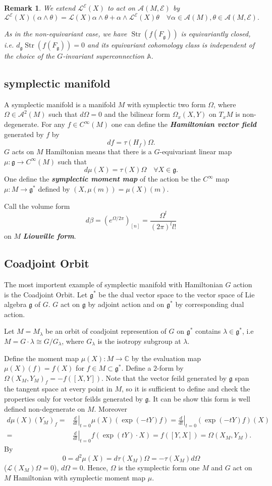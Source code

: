 \documentclass[11pt]{amsart}
\newtheorem{Rmk}[Thm]{Remark}
\def\cA{{\mathcal{A}}}
\def\cL{{\mathcal{L}}}
\def\cLE{\cL^\cE}
\def\cE{{\mathcal{E}}}
\def\bC{{\mathbb{C}}}
\def\bA{{\mathbb{A}}}
\def\Fg{{F_{\fgg}}}
\def\fgg{{\mathfrak{g}}}
\def\dg{{d_{\fgg}}}
\def\Str{\mathop{\mathrm{Str}}}
\def\kw#1{{\bf \em #1}}
\def\ddt{\left.\frac{d}{dt}\right|_{t=0}}
\begin{document}
\begin{Rmk}
We extend $\cL^\cE(X)$ to act on $\cA(M,\cE)$ by 
\[
\cLE(X)(\alpha\wedge \theta) =\cL(X) \alpha \wedge \theta +\alpha
\wedge \cLE(X)\theta \quad \forall \alpha\in \cA(M), \theta\in \cA(M,\cE).
\]

As in the non-equivariant case, we have $\Str(f(\Fg))$ is
equivariantly closed, i.e. $\dg \Str(f(\Fg)) = 0$ and its equivariant
cohomology class is independent of the choice of the $G$-invariant
superconnection $\bA$.
\end{Rmk}


\subsection{symplectic manifold}
A symplectic manifold is a manifold $M$ with symplectic two form
$\Omega$, where $\Omega\in \cA^2(M)$ such that $d\Omega=0$ and
the bilinear form $\Omega_x(X,Y)$ on $T_xM$ is non-degenerate.
For any $f\in C^\infty(M)$ one can define the \kw{Hamiltonian vector
  field} generated by $f$ by 
\[
df = \tau(H_f)\Omega.
\] 
$G$ acts on $M$ Hamiltonian means that there is a $G$-equivariant linear
map $\mu:\fgg\to C^\infty(M)$ such that 
\[
d\mu(X) = \tau(X) \Omega \quad \forall X\in \fgg.
\]
One define the \kw{symplectic moment map} of the action be the
$C^\infty$ map $\mu\colon M\to \fgg^*$ defined by $(X,\mu(m)) =
\mu(X)(m)$.

Call the volume form 
\[
d\beta=(e^{\Omega/2\pi})_[n] = \frac{\Omega^l}{(2\pi)^ll!}
\] 
on $M$ \kw{Liouville form}.

\subsection{Coadjoint Orbit}\label{Sec:co1}
The most importent example of symplectic manifold with Hamiltonian $G$
action is the Coadjoint Orbit. 
Let $\fgg^*$ be the dual vector space to the vector space of Lie
algebra $\fgg$ of $G$. $G$ act on $\fgg$ by adjoint action and on
$\fgg^*$ by corresponding dual action.

Let $M=M_\lambda$ be an orbit of coadjoint represention of $G$ on
$\fgg^*$ contains $\lambda \in \fgg^*$, i.e $M = G\cdot \lambda\cong
G/G_\lambda$, where $G_\lambda$ is the isotropy subgroup at $\lambda$.

Define the moment map $\mu(X)\colon M \to \bC$ by the evaluation map
$\mu(X)(f) = f(X)$ for $f\in M \subset \fgg^*$.
Define a $2$-form by $\Omega(X_M,Y_M)_f =-
f([X,Y])$. Note that the vector feild generated by $\fgg$ span the
tangent space at every point in $M$, so it is sufficient to define and
check the properties only for vector feilds generated by $\fgg$. It can be show this form is well defined non-degenerate on
$M$.
Moreover 
\[
\begin{split}
d\mu(X)(Y_M)_f  =& \ddt \mu(X)(\exp(-tY)f) =  \ddt(\exp(-tY)f)(X) \\
=&
\ddt f(\exp(tY)\cdot X) = f([Y,X]) = \Omega(X_M,Y_M).
\end{split}
\]
By 
\[
0 = d^2\mu(X) = d\tau(X_M)\Omega = -\tau(X_M) d\Omega
\] ($\cL(X_M)\Omega=0$), $d\Omega=0$.
Hence, $\Omega$ is the symplectic form one $M$ and $G$ act on $M$
Hamiltonian with symplectic moment map $\mu$.
\end{document}
